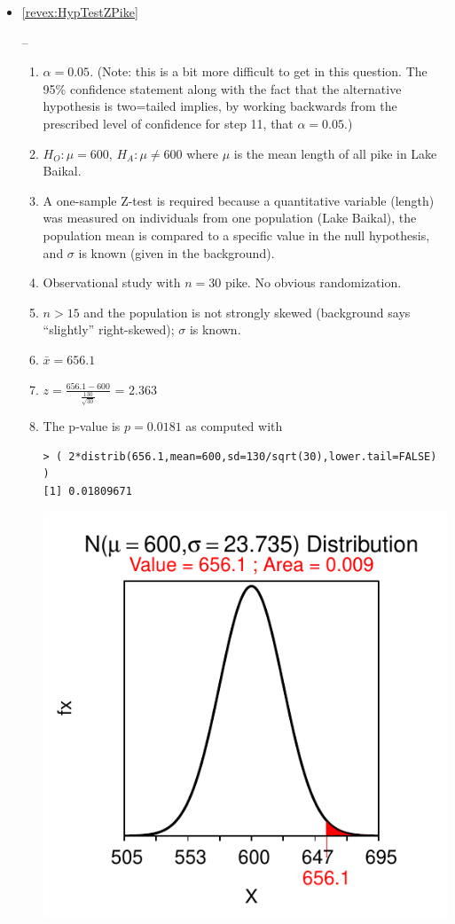 \documentclass[10pt,openany]{book}\usepackage[]{graphicx}\usepackage[]{color}
\makeatletter
\newenvironment{kframe}{%
 \def\at@end@of@kframe{}%
 \ifinner\ifhmode%
  \def\at@end@of@kframe{\end{minipage}}%
  \begin{minipage}{\columnwidth}%
 \fi\fi%
 \def\FrameCommand##1{\hskip\@totalleftmargin \hskip-\fboxsep
 \colorbox{shadecolor}{##1}\hskip-\fboxsep
     \hskip-\linewidth \hskip-\@totalleftmargin \hskip\columnwidth}%
 \MakeFramed {\advance\hsize-\width
   \@totalleftmargin\z@ \linewidth\hsize
   \@setminipage}}%
 {\par\unskip\endMakeFramed%
 \at@end@of@kframe}
\newenvironment{knitrout}{}{} %
\makeatother
\begin{document}
\begin{itemize}
  \item \hypertarget{ans:HypTestZPike}{\ref{revex:HypTestZPike}} --
    \begin{enumerate}
      \item $\alpha=0.05$. (Note: this is a bit more difficult to get in this question.  The 95\% confidence statement along with the fact that the alternative hypothesis is two=tailed implies, by working backwards from the prescribed level of confidence for step 11, that $\alpha=0.05$.)
      \item $H_{O}:\mu=600$, $H_{A}:\mu\neq600$ where $\mu$ is the mean length of all pike in Lake Baikal.
      \item A one-sample Z-test is required because a quantitative variable (length) was measured on individuals from one population (Lake Baikal), the population mean is compared to a specific value in the null hypothesis, and $\sigma$ is known (given in the background).
      \item Observational study with $n=30$ pike.  No obvious randomization.
      \item $n>15$ and the population is not strongly skewed (background says ``slightly'' right-skewed); $\sigma$ is known.
      \item $\bar{x}=656.1$
      \item $z=\frac{656.1-600}{\frac{130}{\sqrt{30}}}$ = $2.363$
      \item The p-value is $p=0.0181$ as computed with
\begin{knitrout}
\color{fgcolor}\begin{kframe}
\begin{verbatim}
> ( 2*distrib(656.1,mean=600,sd=130/sqrt(30),lower.tail=FALSE) )
[1] 0.01809671
\end{verbatim}
\end{kframe}

{\centering \includegraphics[width=.4\linewidth]{Figs/unnamed-chunk-348-1} 

}
\end{knitrout}
\end{enumerate}
\end{itemize}
\end{document}

